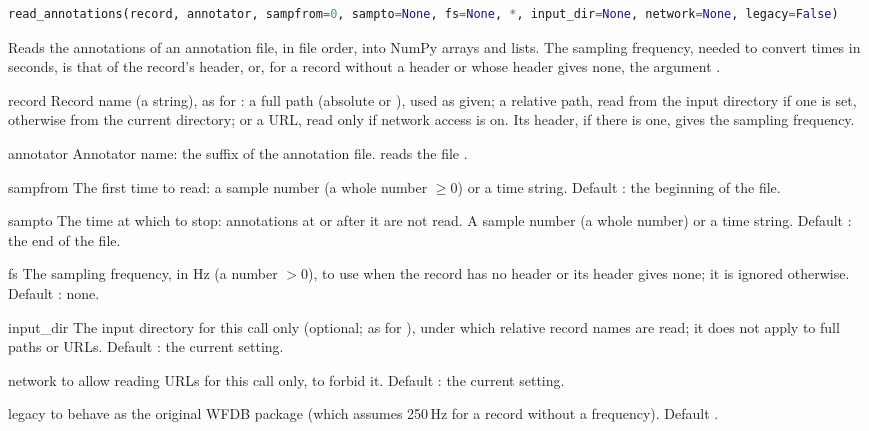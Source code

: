 \begin{lstlisting}[language=Python,style=signature]
read_annotations(record, annotator, sampfrom=0, sampto=None, fs=None, *, input_dir=None, network=None, legacy=False)
\end{lstlisting}
Reads the annotations of an annotation file, in file order, into NumPy arrays and lists.
The sampling frequency, needed to convert times in seconds, is that of the record's
header, or, for a record without a header or whose header gives none, the argument
.
\begin{params}
\item[record] Record name (a string), as for : a full path (absolute or
  \code{\textasciitilde}), used as given; a relative path, read from the input directory
  if one is set, otherwise from the current directory; or a URL, read only if network
  access is on. Its header, if there is one, gives the sampling frequency.
\item[annotator] Annotator name: the suffix of the annotation file.  reads the
  file .
\item[sampfrom] The first time to read: a sample number (a whole number $\ge 0$) or a
  time string. Default : the beginning of the file.
\item[sampto] The time at which to stop: annotations at or after it are not read. A
  sample number (a whole number) or a time string. Default : the end of the
  file.
\item[fs] The sampling frequency, in Hz (a number $> 0$), to use when the record has no
  header or its header gives none; it is ignored otherwise. Default : none.
\item[input\_dir] The input directory for this call only (optional; as for
  ), under which relative record names are read; it does not apply to
  full paths or URLs. Default : the current setting.
\item[network]  to allow reading URLs for this call only,  to forbid
  it. Default : the current setting.
\item[legacy]  to behave as the original WFDB package (which assumes 250\,Hz
  for a record without a frequency). Default .
\end{params}
